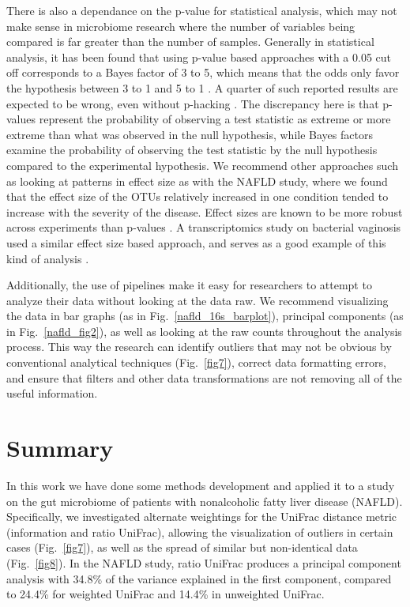 There is also a dependance on the p-value for statistical analysis, which may not make sense in microbiome research where the number of variables being compared is far greater than the number of samples. Generally in statistical analysis, it has been found that using p-value based approaches with a 0.05 cut off corresponds to a Bayes factor of 3 to 5, which means that the odds only favor the hypothesis between 3 to 1 and 5 to 1 \cite{johnson2013revised}. A quarter of such reported results are expected to be wrong, even without p-hacking \cite{johnson2013revised}. The discrepancy here is that p-values represent the probability of observing a test statistic as extreme or more extreme than what was observed in the null hypothesis, while Bayes factors examine the probability of observing the test statistic by the null hypothesis compared to the experimental hypothesis. We recommend other approaches such as looking at patterns in effect size as with the NAFLD study, where we found that the effect size of the OTUs relatively increased in one condition tended to increase with the severity of the disease. Effect sizes are known to be more robust across experiments than p-values \cite{halsey2015fickle}. A transcriptomics study on bacterial vaginosis used a similar effect size based approach, and serves as a good example of this kind of analysis \cite{macklaim2013comparative}.

Additionally, the use of pipelines make it easy for researchers to attempt to analyze their data without looking at the data raw. We recommend visualizing the data in bar graphs (as in Fig.~\ref{nafld_16s_barplot}), principal components (as in Fig.~\ref{nafld_fig2}), as well as looking at the raw counts throughout the analysis process. This way the research can identify outliers that may not be obvious by conventional analytical techniques (Fig.~\ref{fig7}), correct data formatting errors, and ensure that filters and other data transformations are not removing all of the useful information.

\section{Summary}

In this work we have done some methods development and applied it to a study on the gut microbiome of patients with nonalcoholic fatty liver disease (NAFLD). Specifically, we investigated alternate weightings for the UniFrac distance metric (information and ratio UniFrac), allowing the visualization of outliers in certain cases (Fig.~\ref{fig7}), as well as the spread of similar but non-identical data (Fig.~\ref{fig8}). In the NAFLD study, ratio UniFrac produces a principal component analysis with 34.8\% of the variance explained in the first component, compared to 24.4\% for weighted UniFrac and 14.4\% in unweighted UniFrac.

